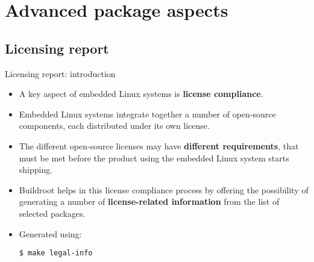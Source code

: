 
\section{Advanced package aspects}

\subsection{Licensing report}

\begin{frame}[fragile]{Licensing report: introduction}
  \begin{itemize}
  \item A key aspect of embedded Linux systems is {\bf license
      compliance}.
  \item Embedded Linux systems integrate together a number of
    open-source components, each distributed under its own license.
  \item The different open-source licenses may have {\bf different
      requirements}, that must be met before the product using the
    embedded Linux system starts shipping.
  \item Buildroot helps in this license compliance process by offering
    the possibility of generating a number of {\bf license-related
      information} from the list of selected packages.
  \item Generated using:
\begin{block}{}
\begin{verbatim}
$ make legal-info
\end{verbatim}
\end{block}
  \end{itemize}
\end{frame}

